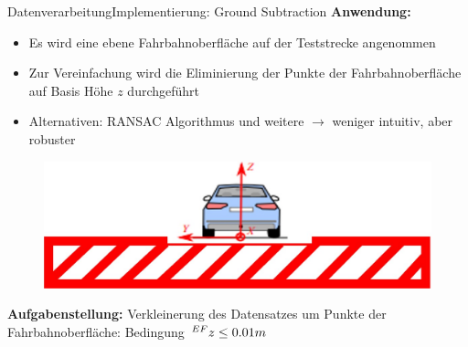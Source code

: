 \documentclass[169, handout	]{THIbeamer} %
\begin{document}
	\begin{frame}{Datenverarbeitung}{Implementierung: Ground Subtraction}
		\textbf{Anwendung:}
		\begin{itemize}
			\item Es wird eine ebene Fahrbahnoberfläche auf der Teststrecke angenommen
			\item Zur Vereinfachung wird die Eliminierung der Punkte der Fahrbahnoberfläche auf Basis Höhe $z$ durchgeführt
			\item Alternativen: RANSAC Algorithmus und weitere $\rightarrow$ weniger intuitiv, aber robuster			
		\end{itemize}
		\begin{figure}
			\includegraphics[scale=0.5]{required/Ground Subtraction Implementierung.jpg} 
		\end{figure}
		\textbf{Aufgabenstellung:} Verkleinerung des Datensatzes um Punkte der Fahrbahnoberfläche: Bedingung $\hspace*{0.2em}^{EF}\vspace*{-0.2em}z \leq 0.01m$
	\end{frame}
\end{document}

